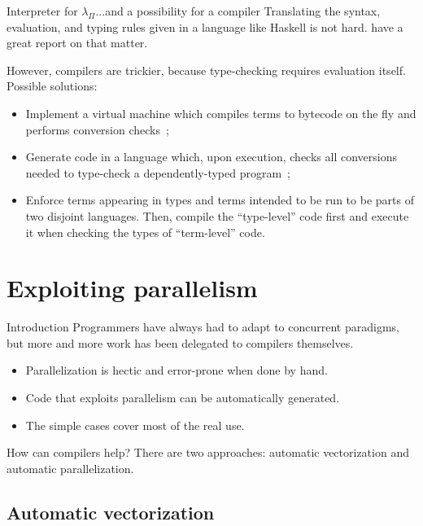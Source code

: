 \documentclass[serif, xcolor={svgnames, table}, usepdftitle=false]{beamer}
\begin{document}
\begin{frame}{Interpreter for \(\lambda_{\Pi}\)}{...and a possibility
    for a compiler}
  Translating the syntax, evaluation, and typing rules given in a
  language like Haskell is not hard.
  \Textcite{Loh:2010:TID:1883634.1883637} have a great report on that
  matter.

  However, compilers are trickier, because type-checking requires
  evaluation itself.  Possible solutions:
  \begin{itemize}
  \item Implement a virtual machine which compiles terms to bytecode
    on the fly and performs conversion
    checks~\autocite{Gregoire:2002:CIS:581478.581501};
  \item Generate code in a language which, upon execution, checks all
    conversions needed to type-check a dependently-typed
    program~\autocite{Boespflug:2011:FRF:2178104.2178141};
  \item Enforce terms appearing in types and terms intended to be run to
    be parts of two disjoint languages.  Then, compile the
    ``type-level'' code first and execute it when checking the types of
    ``term-level'' code.
  \end{itemize}
\end{frame}

\section{Exploiting parallelism}

\begin{frame}{Introduction}
  Programmers have always had to adapt to concurrent paradigms, but
  more and more work has been delegated to compilers themselves.
  \begin{itemize}
  \item Parallelization is hectic and error-prone when done by hand.
  \item Code that exploits parallelism can be automatically generated.
  \item The simple cases cover most of the real use.
  \end{itemize}

  \begin{block}{How can compilers help?}
    There are two approaches: automatic vectorization and automatic
    parallelization.
  \end{block}
\end{frame}

\subsection{Automatic vectorization}
\end{document}
